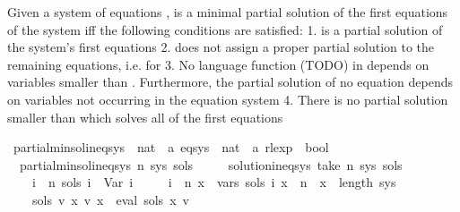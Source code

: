 \begin{isabellebody}
\begin{isamarkuptext}%
Given a system of equations ,  is a minimal partial solution of the first 
equations of the system iff the following conditions are satisfied:
1.  is a partial solution of the system's first  equations
2.  does not assign a proper partial solution to the remaining equations,
   i.e.  for 
3. No language function (TODO) in  depends on variables smaller than .
   Furthermore, the partial solution of no equation depends on variables not occurring in the equation system
4. There is no partial solution smaller than  which solves all of the first  equations%
\end{isamarkuptext}\isamarkuptrue%
\isamarkupfalse%
\ partial{\isacharunderscore}{\kern0pt}min{\isacharunderscore}{\kern0pt}sol{\isacharunderscore}{\kern0pt}ineq{\isacharunderscore}{\kern0pt}sys\ {\isacharcolon}{\kern0pt}{\isacharcolon}{\kern0pt}\ {\isachardoublequoteopen}nat\ {\isasymRightarrow}\ {\isacharprime}{\kern0pt}a\ eq{\isacharunderscore}{\kern0pt}sys\ {\isasymRightarrow}\ {\isacharparenleft}{\kern0pt}nat\ {\isasymRightarrow}\ {\isacharprime}{\kern0pt}a\ rlexp{\isacharparenright}{\kern0pt}\ {\isasymRightarrow}\ bool{\isachardoublequoteclose}\ \isanewline
\ \ {\isachardoublequoteopen}partial{\isacharunderscore}{\kern0pt}min{\isacharunderscore}{\kern0pt}sol{\isacharunderscore}{\kern0pt}ineq{\isacharunderscore}{\kern0pt}sys\ n\ sys\ sols\ {\isasymequiv}\isanewline
\ \ \ \ solution{\isacharunderscore}{\kern0pt}ineq{\isacharunderscore}{\kern0pt}sys\ {\isacharparenleft}{\kern0pt}take\ n\ sys{\isacharparenright}{\kern0pt}\ sols\ {\isasymand}\isanewline
\ \ \ \ {\isacharparenleft}{\kern0pt}{\isasymforall}i\ {\isasymge}\ n{\isachardot}{\kern0pt}\ sols\ i\ {\isacharequal}{\kern0pt}\ Var\ i{\isacharparenright}{\kern0pt}\ {\isasymand}\isanewline
\ \ \ \ {\isacharparenleft}{\kern0pt}{\isasymforall}i\ {\isacharless}{\kern0pt}\ n{\isachardot}{\kern0pt}\ {\isasymforall}x\ {\isasymin}\ vars\ {\isacharparenleft}{\kern0pt}sols\ i{\isacharparenright}{\kern0pt}{\isachardot}{\kern0pt}\ x\ {\isasymge}\ n\ {\isasymand}\ x\ {\isacharless}{\kern0pt}\ length\ sys{\isacharparenright}{\kern0pt}\ {\isasymand}\isanewline
\ \ \ \ {\isacharparenleft}{\kern0pt}{\isasymforall}sols{\isacharprime}{\kern0pt}\ v{\isacharprime}{\kern0pt}{\isachardot}{\kern0pt}\ {\isacharparenleft}{\kern0pt}{\isasymforall}x{\isachardot}{\kern0pt}\ v{\isacharprime}{\kern0pt}\ x\ {\isacharequal}{\kern0pt}\ eval\ {\isacharparenleft}{\kern0pt}sols{\isacharprime}{\kern0pt}\ x{\isacharparenright}{\kern0pt}\ v{\isacharprime}{\kern0pt}{\isacharparenright}{\kern0pt}\isanewline

\end{isabellebody}
